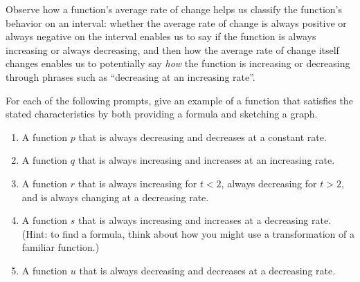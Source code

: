 \documentclass[nooutcomes]{ximera}
\begin{document}
Observe how a function's average rate of change helps us classify the function's behavior on an interval:  whether the average rate of change is always positive or always negative on the interval enables us to say if the function is always increasing or always decreasing, and then how the average rate of change itself changes enables us to potentially say \emph{how} the function is increasing or decreasing through phrases such as ``decreasing at an increasing rate''.

\begin{exploration}

For each of the following prompts, give an example of a function that satisfies the stated characteristics by both providing a formula and sketching a graph.

\begin{enumerate}[label=\alph*.]
\item A function $p$ that is always decreasing and decreases at a constant rate.
\item A function $q$ that is always increasing and increases at an increasing rate.
\item A function $r$ that is always increasing for $t \lt 2$, always decreasing for $t \gt 2$, and is always changing at a decreasing rate.
\item A function $s$ that is always increasing and increases at a decreasing rate.  (Hint: to find a formula, think about how you might use a transformation of a familiar function.)
\item A function $u$ that is always decreasing and decreases at a decreasing rate.

\end{enumerate}

\end{exploration}
\end{document}
